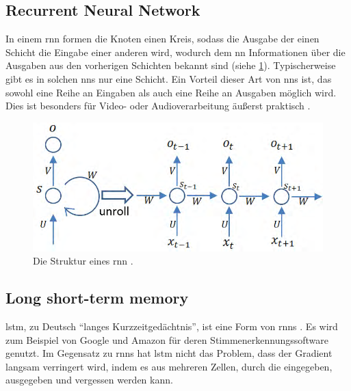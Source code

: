 \subsection{Recurrent Neural Network}
In einem \ac{rnn} formen die Knoten einen Kreis, sodass die Ausgabe der einen Schicht die Eingabe einer anderen wird,
wodurch dem \ac{nn} Informationen über die Ausgaben aus den vorherigen Schichten bekannt sind (siehe \cref{fig:struktur-rnn}).
Typischerweise gibt es in solchen \acp{nn} nur eine Schicht.
Ein Vorteil dieser Art von \acp{nn} ist, das sowohl eine Reihe an Eingaben als auch eine Reihe an Ausgaben möglich wird.
Dies ist besonders für Video- oder Audioverarbeitung äußerst praktisch \citep{deeplearningarchitecturesreview}.
\begin{figure}%
\centering
\includegraphics[width=\textwidth, height=\textheight, keepaspectratio]{Images/RNN.png}
\caption[Struktur von RNNs]{Die Struktur eines \ac{rnn} \citep{deeplearningarchitecturesreview}.}
\label{fig:struktur-rnn}
\end{figure}

\subsection{Long short-term memory}
\ac{lstm}, zu Deutsch \enquote{langes Kurzzeitgedächtnis}, ist eine Form von \acp{rnn} \citep{lstm}.
Es wird zum Beispiel von Google und Amazon für deren Stimmenerkennungssoftware genutzt.
Im Gegensatz zu \acp{rnn} hat \ac{lstm} nicht das Problem, dass der Gradient langsam verringert wird,
indem es aus mehreren Zellen, durch die eingegeben, ausgegeben und vergessen werden kann.

